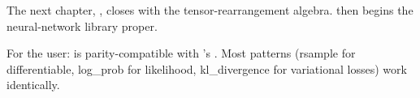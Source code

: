 The next chapter, , closes
 with the tensor-rearrangement
algebra.  then begins the
neural-network library proper.

\begin{lucidnote}
For the user:  is parity-compatible
with 's . Most patterns
(rsample for differentiable, log\_prob for likelihood, kl\_divergence
for variational losses) work identically.
\end{lucidnote}
